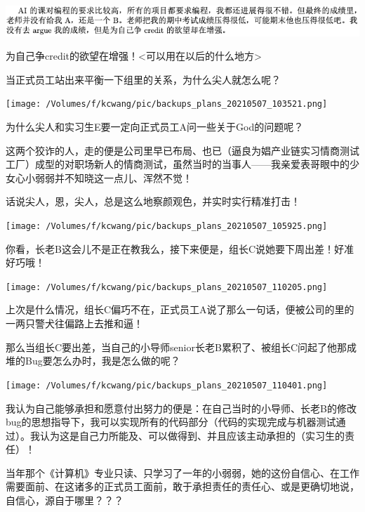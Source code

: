 \documentclass[9pt, b5paper]{article}
\begin{document}
\begin{center}
\includegraphics[width=.9\linewidth]{./pic/backups_plans_20210424_215822.png}
\end{center}

为自己争credit的欲望在增强！<可以用在以后的什么地方>

当正式员工站出来平衡一下组里的关系，为什么尖人就怎么呢？

\begin{center}
\texttt{[image: /Volumes/f/kcwang/pic/backups\_plans\_20210507\_103521.png]}
\end{center}

为什么尖人和实习生E要一定向正式员工A问一些关于God的问题呢？

这两个狡诈的人，走的便是公司里早已布局、也已（逼良为娼产业链实习情商测试工厂）成型的对职场新人的情商测试，虽然当时的当事人——我亲爱表哥眼中的少女心小弱弱并不知晓这一点儿、浑然不觉！

话说尖人，恩，尖人，总是这么地察颜观色，并实时实行精准打击！

\begin{center}
\texttt{[image: /Volumes/f/kcwang/pic/backups\_plans\_20210507\_105925.png]}
\end{center}

你看，长老B这会儿不是正在教我么，接下来便是，组长C说她要下周出差！好准好巧哦！

\begin{center}
\texttt{[image: /Volumes/f/kcwang/pic/backups\_plans\_20210507\_110205.png]}
\end{center}

上次是什么情况，组长C偏巧不在，正式员工A说了那么一句话，便被公司的里的一两只警犬往偏路上去推和逼！

那么当组长C要出差，当自己的小导师senior长老B累积了、被组长C问起了他那成堆的Bug要怎么办时，我是怎么做的呢？

\begin{center}
\texttt{[image: /Volumes/f/kcwang/pic/backups\_plans\_20210507\_110401.png]}
\end{center}

我认为自己能够承担和愿意付出努力的便是：在自己当时的小导师、长老B的修改bug的思想指导下，我可以实现所有的代码部分（代码的实现完成与机器测试通过）。我认为这是自己力所能及、可以做得到、并且应该主动承担的（实习生的责任）！ 

当年那个《计算机》专业只读、只学习了一年的小弱弱，她的这份自信心、在工作需要面前、在这诸多的正式员工面前，敢于承担责任的责任心、或是更确切地说，自信心，源自于哪里？？？
\end{document}
